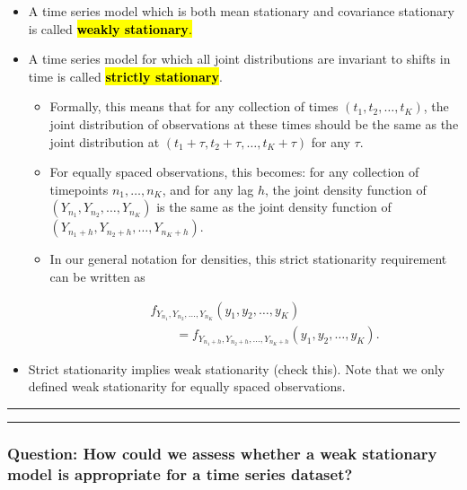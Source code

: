 \documentclass[]{article}
\begin{document}
\begin{itemize}
\item
  A time series model which is both mean stationary and covariance
  stationary is called \hl{\textbf{weakly stationary}.}
\item
  A time series model for which all joint distributions are invariant to
  shifts in time is called \hl{\textbf{strictly stationary}}.

  \begin{itemize}
  \item
    Formally, this means that for any collection of times
    \((t_1, t_2,\dots,t_K)\), the joint distribution of observations at
    these times should be the same as the joint distribution at
    \((t_1+\tau, t_2+\tau,\dots,t_K+\tau)\) for any \(\tau\).
  \item
    For equally spaced observations, this becomes: for any collection of
    timepoints \(n_1,\dots,n_K\), and for any lag \(h\), the joint
    density function of \((Y_{n_1},Y_{n_2},\dots, Y_{n_K})\) is the same
    as the joint density function of
    \((Y_{n_1+h},Y_{n_2+h},\dots, Y_{n_K+h})\).
  \item
    In our general notation for densities, this strict stationarity
    requirement can be written as

    \begin{eqnarray}&&f_{Y_{n_1},Y_{n_2},\dots, Y_{n_K}}(y_1,y_2,\dots,y_K)\\
    &&\quad\quad = f_{Y_{n_1+h},Y_{n_2+h},\dots, Y_{n_K+h}}(y_1,y_2,\dots,y_K).
    \end{eqnarray}
  \end{itemize}
\item
  Strict stationarity implies weak stationarity (check this). Note that
  we only defined weak stationarity for equally spaced observations.
\end{itemize}

\begin{center}\rule{0.5\linewidth}{\linethickness}\end{center}

\begin{center}\rule{0.5\linewidth}{\linethickness}\end{center}

\subsubsection{Question: How could we assess whether a weak stationary
model is appropriate for a time series
dataset?}\label{question-how-could-we-assess-whether-a-weak-stationary-model-is-appropriate-for-a-time-series-dataset}
\end{document}
